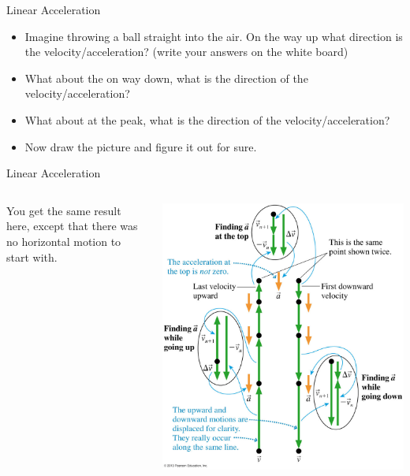 \documentclass{beamer}
\begin{document}
\begin{frame}{Linear Acceleration}
\begin{itemize}
   \item Imagine throwing a ball straight into the air. On the way up what direction is the velocity/acceleration? (write your answers on the white board)
   \item<2-> What about the on way down, what is the direction of the velocity/acceleration?
   \item<3-> What about at the peak, what is the direction of the velocity/acceleration?
   \item<4-> Now draw the picture and figure it out for sure.
\end{itemize}
\end{frame}

\begin{frame}{Linear Acceleration}
\begin{columns}
\begin{column}{0.3\textwidth}
   You get the same result here, except that there was no horizontal motion to start with.
\end{column}
\begin{column}{0.70\textwidth}
   \begin{center}
      \includegraphics[height=0.9\textheight]{../figures/01_18_Figure.jpg}
   \end{center}
\end{column}
\end{columns}
\end{frame}
\end{document}
